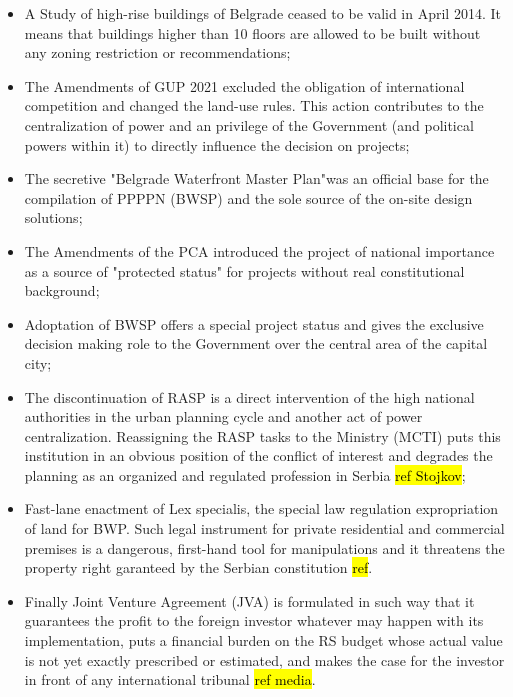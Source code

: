 \documentclass[11pt]{report}
\begin{document}
\begin{itemize}
\item A Study of high-rise buildings of Belgrade ceased to be valid in April 2014. It means that buildings higher than 10 floors are allowed to be built without any zoning restriction or recommendations;
\item The Amendments of GUP 2021 excluded the obligation of international competition and changed the land-use rules. This action contributes to the centralization of power and an privilege of the Government (and political powers within it) to directly influence the decision on projects;
\item The secretive "Belgrade Waterfront Master Plan"was an official base for the compilation of PPPPN (BWSP) and the sole source of the on-site design solutions;
\item  The Amendments of the PCA introduced the project of national importance as a source of "protected status" for projects without real constitutional background;
\item Adoptation of BWSP offers a special project status and gives the exclusive decision making role to the Government over the central area of the capital city; 
\item The discontinuation of RASP is a direct intervention of the high national authorities in the urban planning cycle and another act of power centralization. Reassigning the RASP tasks to the Ministry (MCTI) puts this institution in an obvious position of the conflict of interest and degrades the planning as an organized and regulated profession in Serbia \hl{ref Stojkov};
\item Fast-lane enactment of Lex specialis, the special law regulation expropriation of land for BWP. Such legal instrument for private residential and commercial premises is a dangerous, first-hand tool for manipulations and it threatens the property right garanteed by the Serbian constitution \hl{ref}.
\item Finally Joint Venture Agreement (JVA) is formulated in such way that it guarantees the profit to the foreign investor whatever may happen with its implementation, puts a financial burden on the RS budget whose actual value is not yet exactly prescribed or estimated, and makes the case for the investor in front of any international tribunal \hl{ref media}.\footnotemark
{}
\end{itemize}
\end{document}

